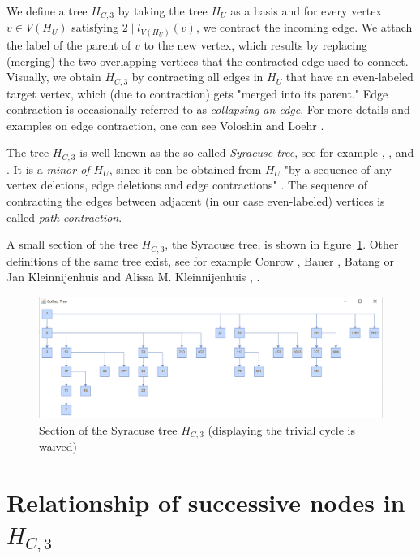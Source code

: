 We define a tree $H_{C,3}$ by taking the tree $H_U$ as a basis and for every vertex $v\in V(H_U)$ satisfying $2\mid l_{V(H_U)}(v)$, we contract the incoming edge. We attach the label of the parent of $v$ to the new vertex, which results by replacing (merging) the two overlapping vertices that the contracted edge used to connect. Visually, we obtain $H_{C,3}$ by contracting all edges in $H_U$ that have an even-labeled target vertex, which (due to contraction) gets "merged into its parent." Edge contraction is occasionally referred to as \textit{collapsing an edge}. For more details and examples on edge contraction, one can see Voloshin \cite[p.~27]{Ref_Voloshin} and Loehr \cite{Ref_Loehr}.

The tree $H_{C,3}$ is well known as the so-called \textit{Syracuse tree}, see for example \cite{Ref_Kleinnijenhuis_2020a}, \cite{Ref_Aberkane_2017}, and \cite{Ref_Aberkane_2020}. It is a \textit{minor of $H_U$}, since it can be obtained from $H_U$ "by a sequence of any vertex deletions, edge deletions and edge contractions" \cite[p.~32]{Ref_Voloshin}. The sequence of contracting the edges between adjacent (in our case even-labeled) vertices is called \textit{path contraction}.

A small section of the tree $H_{C,3}$, the Syracuse tree, is shown in figure~\ref{fig:2}. Other definitions of the same tree exist, see for example Conrow \cite{Ref_Conrow}, Bauer \cite[p.~379]{Ref_Bauer}, Batang \cite{Ref_Batang} or Jan Kleinnijenhuis and Alissa M. Kleinnijenhuis \cite{Ref_Kleinnijenhuis_2020a}, \cite{Ref_Kleinnijenhuis_2020b}.

\begin{figure}
	\includegraphics[width=1.00\textwidth]{figures/h_c3.png}
	\caption{Section of the Syracuse tree $H_{C,3}$ (displaying the trivial cycle is waived)}
	\label{fig:2}
\end{figure}

\section{\texorpdfstring{Relationship of successive nodes in $H_{C,3}$}{Relationship of successive nodes in HC3}}

